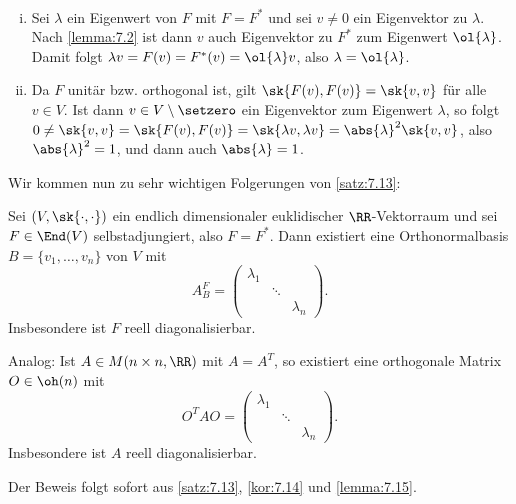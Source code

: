 \begin{beweis}
	\mbox{} \\[-.9cm]
	\begin{enumerate}[(i)]
		\item Sei $\lambda$ ein Eigenwert von $F$ mit $F = F^*$ und sei $v \neq 0$ ein Eigenvektor zu $\lambda$.
		Nach \autoref{lemma:7.2} ist dann $v$ auch Eigenvektor zu $F^*$ zum Eigenwert $\ol{\lambda}$.
		Damit folgt $\lambda v = F(v) = F^*(v) = \ol{\lambda} v$, also $\lambda = \ol{\lambda}$.
		\item Da $F$ unitär bzw. orthogonal ist, gilt $\sk{F(v),F(v)} = \sk{v,v}$ für alle $v \in V$.
		Ist dann $v \in V \setminus \setzero$ ein Eigenvektor zum Eigenwert $\lambda$, so folgt $0 \neq \sk{v,v} = \sk{F(v),F(v)} = \sk{\lambda v,\lambda v} = \abs{\lambda}^2 \sk{v,v}$, also $\abs{\lambda}^2 = 1$, und dann auch $\abs{\lambda} = 1$. 
	\end{enumerate}
\end{beweis}

Wir kommen nun zu sehr wichtigen Folgerungen von \autoref{satz:7.13}:

\begin{korollar}
	\label{kor:7.16}
	Sei $(V,\sk{\cdot,\cdot})$ ein endlich dimensionaler euklidischer $\RR$-Vektorraum und sei $F \in \End(V)$ selbstadjungiert, also $F = F^*$.
	Dann existiert eine Orthonormalbasis $B = \{v_1,\dots,v_n\}$ von $V$ mit
	\[
		A_B^F = \begin{pmatrix}
		\lambda_1 & & \\
		& \ddots & \\
		& & \lambda_n
		\end{pmatrix}.
	\]
	Insbesondere ist $F$ reell diagonalisierbar.
	
	Analog: Ist $A \in M(n \times n,\RR)$ mit $A = A^T$, so existiert eine orthogonale Matrix $O \in \oh(n)$ mit
	\[
		O^TAO = \begin{pmatrix}
		\lambda_1 & & \\
		& \ddots & \\
		& & \lambda_n
		\end{pmatrix}.
	\]
	Insbesondere ist $A$ reell diagonalisierbar.
\end{korollar}

\begin{beweis}
	Der Beweis folgt sofort aus \autoref{satz:7.13}, \autoref{kor:7.14} und \autoref{lemma:7.15}. 
\end{beweis}

